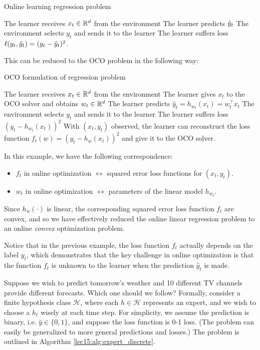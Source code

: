 \begin{algorithm}
\caption{Online learning regression problem}
 {
The learner receives $x_t \in \mathbb R^d$ from the environment\;
The learner predicts $\hat{y}_t$\;
The environment selects $y_t$ and sends it to the learner\;
The learner suffers loss $\ell(y_t, \hat{y}_t) = (y_t-\hat{y}_t)^2$.
}
\end{algorithm}

This can be reduced to the OCO problem in the following way:

\begin{algorithm}
\caption{OCO formulation of regression problem}
 {
The learner receives $x_t \in \mathbb R^d$ from the environment\;
The learner gives $x_t$ to the OCO solver and obtains $w_t \in \mathbb R^d$\;
The learner predicts $\hat{y}_t = h_{w_t}(x_t) = w_t^\top x_t$\;
The environment selects $y_t$ and sends it to the learner\;
The learner suffers loss $(y_t - h_{w_t}(x_t))^2$\;
With $(x_t, y_t)$ observed, the learner can reconstruct the loss function $f_t(w) = (y_t -h_{w}(x_t))^2$ and give it to the OCO solver.
}
\end{algorithm}

In this example, we have the following correspondence:
\begin{itemize}
\item $f_t$ in online optimization $\leftrightarrow$ squared error loss functions for $(x_t, y_t)$.
\item $w_t$ in online optimization $\leftrightarrow$ parameters of the linear model $h_{w_t}$.
\end{itemize}
    
Since $h_w(\cdot)$ is linear, the corresponding squared error loss function $f_t$ are convex, and so we have effectively reduced the online linear regression problem to an online \emph{convex} optimization problem.
    
Notice that in the previous example, the loss function $f_t$ actually depends on the label $y_t$, which demonstrates that the key challenge in online optimization is that the function $f_t$ is unknown to the learner when the prediction $\hat{y}_t$ is made.
    
Suppose we wish to predict tomorrow's weather and 10 different TV channels provide different forecasts. Which one should we follow? Formally, consider a finite hypothesis class $\mathcal{H}$, where each $h \in \mathcal{H}$ represents an expert, and we wish to choose a $h_t$ wisely at each time step. For simplicity, we assume the prediction is binary, i.e. $\hat{y} \in \{0, 1\}$, and suppose the loss function is 0-1 loss. (The problem can easily be generalized to more general predictions and losses.) The problem is outlined in Algorithm \ref{lec15:alg:expert_discrete}.

